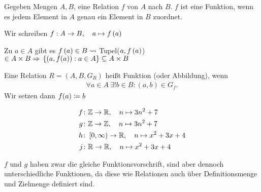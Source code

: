 \begin{bemerkung}
    Gegeben Mengen $A, B$, eine Relation $f$ von $A$ nach $B$. $f$ ist eine Funktion, wenn es jedem Element in $A$ genau ein Element in $B$ zuordnet.
\end{bemerkung}

\begin{notation}[Pfeilnotation]
    Wir schreiben $f: A \rightarrow{} B,\quad a\mapsto f\left(a\right)$
\end{notation}
\begin{folgerung}
    Zu $a\in A$ gibt es $f\left(a\right)\in B \leadsto$ Tupel($a, f\left(a\right)$) $\in A\times B \Rightarrow{} \left\{\left(a, f(a)\right): a\in A\right\} \subseteq A\times B$
\end{folgerung}

\begin{definition}[Funktion]
    Eine Relation $R = (A, B, G_R)$ heißt Funktion (oder Abbildung), wenn
    \begin{align*}
        \forall a\in A~\exists! b\in B: (a,b)\in G_f.
    \end{align*}
    Wir setzen dann $f(a)\coloneqq b$
\end{definition}

\begin{beispiel}
    \theoremescape
    \begin{align*}
        f\colon &\mathbb{Z} \rightarrow \mathbb{R},\quad n\mapsto 3n^2+7\\
        g\colon &\mathbb{Z} \rightarrow \mathbb{Z},\quad n\mapsto 3n^2+7\\
        h\colon &\left[0, \infty\right) \rightarrow \mathbb{R},\quad n\mapsto x^2+3x+4\\
        j\colon &\mathbb{R} \rightarrow \mathbb{R},\quad n\mapsto x^2+3x+4\\
    \end{align*}
\end{beispiel}
\begin{bemerkung}
    $f$ und $g$ haben zwar die gleiche Funktionsvorschrift, sind aber dennoch unterschiedliche Funktionen, da diese wie Relationen auch über Definitionsmenge und Zielmenge definiert sind.
\end{bemerkung}

